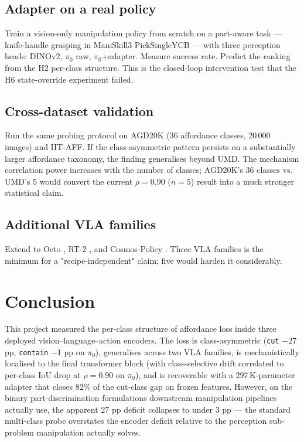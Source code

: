 \documentclass[11pt]{article}
\begin{document}
\subsection{Adapter on a real policy}

Train a vision-only manipulation policy from scratch on a part-aware
task --- knife-handle grasping in ManiSkill3 PickSingleYCB --- with
three perception heads: DINOv2, $\pi_0$ raw, $\pi_0$+adapter. Measure
success rate. Predict the ranking from the H2 per-class structure.
This is the closed-loop intervention test that the H6 state-override
experiment failed.

\subsection{Cross-dataset validation}

Run the same probing protocol on AGD20K (36 affordance classes,
20\,000 images) and IIT-AFF. If the class-asymmetric pattern persists
on a substantially larger affordance taxonomy, the finding generalises
beyond UMD. The mechanism correlation power increases with the number
of classes; AGD20K's 36 classes vs. UMD's 5 would convert the current
$\rho = 0.90$ ($n = 5$) result into a much stronger statistical claim.

\subsection{Additional VLA families}

Extend to Octo \cite{octo2024}, RT-2 \cite{rt22023}, and Cosmos-Policy
\cite{cosmospolicy2025}. Three VLA families is the minimum for a
"recipe-independent" claim; five would harden it considerably.

\section{Conclusion}
\label{sec:conclusion}

This project measured the per-class structure of affordance loss
inside three deployed vision--language--action encoders. The loss is
class-asymmetric (\texttt{cut} $-$27 pp, \texttt{contain} $-$1 pp on
$\pi_0$), generalises across two VLA families, is mechanistically
localised to the final transformer block (with class-selective drift
correlated to per-class IoU drop at $\rho = 0.90$ on $\pi_0$), and is
recoverable with a 297\,K-parameter adapter that closes 82\% of the
cut-class gap on frozen features. However, on the binary
part-discrimination formulations downstream manipulation pipelines
actually use, the apparent 27 pp deficit collapses to under 3 pp ---
the standard multi-class probe overstates the encoder deficit relative
to the perception sub-problem manipulation actually solves.
\end{document}
